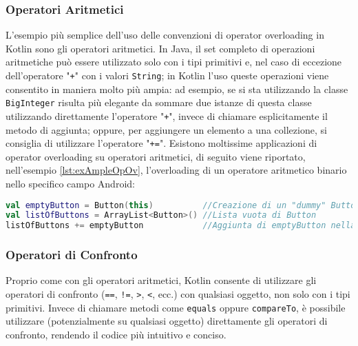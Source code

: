 \subsubsection{Operatori Aritmetici}
L'esempio più semplice dell'uso delle convenzioni di operator overloading in Kotlin sono gli operatori aritmetici. In Java, il set completo di operazioni aritmetiche può essere utilizzato solo con i tipi primitivi e, nel caso di eccezione dell'operatore "\texttt{+}" con i valori \texttt{String}; in Kotlin l'uso queste operazioni viene consentito in maniera molto più ampia: ad esempio, se si sta utilizzando la classe \texttt{BigInteger} risulta più elegante da sommare due istanze di questa classe utilizzando direttamente l’operatore "\texttt{+}", invece di chiamare esplicitamente il metodo di aggiunta; oppure, per aggiungere un elemento a una collezione, si consiglia di utilizzare l'operatore "\texttt{+=}". Esistono moltissime applicazioni di operator overloading su operatori aritmetici, di seguito viene riportato, nell'esempio \ref{lst:exAmpleOpOv}, l'overloading di un operatore aritmetico binario nello specifico campo Android:\\

\begin{lstlisting}[caption={Operatore aritmeticos su una lista}, captionpos=b, label={lst:exAmpleOpOv}, language=Kotlin]
val emptyButton = Button(this)	        //Creazione di un "dummy" Button
val listOfButtons = ArrayList<Button>() //Lista vuota di Button
listOfButtons += emptyButton            //Aggiunta di emptyButton nella lista
\end{lstlisting}

\subsubsection{Operatori di Confronto}
Proprio come con gli operatori aritmetici, Kotlin consente di utilizzare gli operatori di confronto (\texttt{==}, \texttt{!=}, \texttt{>}, \texttt{<}, ecc.) con qualsiasi oggetto, non solo con i tipi primitivi. Invece di chiamare metodi come \texttt{equals} oppure \texttt{compareTo}, è possibile utilizzare (potenzialmente su qualsiasi oggetto) direttamente gli operatori di confronto, rendendo il codice più intuitivo e conciso.\\

